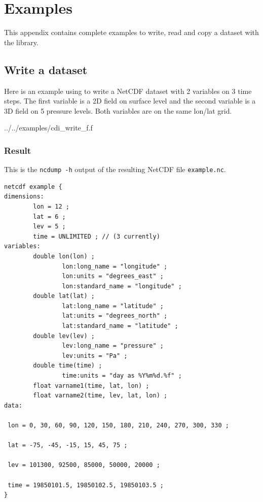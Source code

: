 
\chapter{\label{example}Examples}

This appendix contains complete examples to write, read
and copy a dataset with the {\CDI} library.


\section{\label{example_write}Write a dataset}

Here is an example using {\CDI} to write a NetCDF dataset with 
2 variables on 3 time steps. The first variable is a 2D field
on surface level and the second variable is a 3D field on 5 pressure
levels. Both variables are on the same lon/lat grid. 


{../../examples/cdi_write_f.f}


\subsection{Result}

This is the {\tt ncdump -h} output of the resulting NetCDF file {\tt example.nc}.

\begin{lstlisting}[]
netcdf example {
dimensions:
        lon = 12 ;
        lat = 6 ;
        lev = 5 ;
        time = UNLIMITED ; // (3 currently)
variables:
        double lon(lon) ;
                lon:long_name = "longitude" ;
                lon:units = "degrees_east" ;
                lon:standard_name = "longitude" ;
        double lat(lat) ;
                lat:long_name = "latitude" ;
                lat:units = "degrees_north" ;
                lat:standard_name = "latitude" ;
        double lev(lev) ;
                lev:long_name = "pressure" ;
                lev:units = "Pa" ;
        double time(time) ;
                time:units = "day as %Y%m%d.%f" ;
        float varname1(time, lat, lon) ;
        float varname2(time, lev, lat, lon) ;
data:

 lon = 0, 30, 60, 90, 120, 150, 180, 210, 240, 270, 300, 330 ;

 lat = -75, -45, -15, 15, 45, 75 ;

 lev = 101300, 92500, 85000, 50000, 20000 ;

 time = 19850101.5, 19850102.5, 19850103.5 ;
}
\end{lstlisting}


